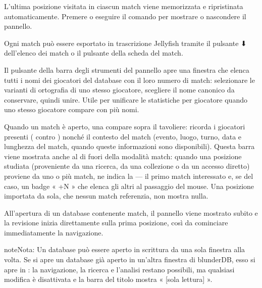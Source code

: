 \documentclass[letterpaper,10pt,italian]{sphinxmanual}
\begin{document}
\sphinxAtStartPar
L’ultima posizione visitata in ciascun match viene memorizzata e ripristinata automaticamente. Premere  o eseguire il comando  per mostrare o nascondere il pannello.

\sphinxAtStartPar
Ogni match può essere esportato in trascrizione Jellyfish  tramite il pulsante ⬇ dell’elenco dei match o il pulsante  della scheda del match.

\sphinxAtStartPar
Il pulsante  della barra degli strumenti del pannello apre una finestra che elenca tutti i nomi dei giocatori del database con il loro numero di match: selezionare le varianti di ortografia di uno stesso giocatore, scegliere il nome canonico da conservare, quindi unire. Utile per unificare le statistiche per giocatore quando uno stesso giocatore compare con più nomi.

\sphinxAtStartPar
Quando un match è aperto, una  compare sopra il tavoliere: ricorda i giocatori presenti ( contro ) nonché il contesto del match (evento, luogo, turno, data e lunghezza del match, quando queste informazioni sono disponibili). Questa barra viene mostrata anche al di fuori della modalità match: quando una posizione studiata (proveniente da una ricerca, da una collezione o da un accesso diretto) proviene da uno o più match, ne indica la  — il primo match interessato e, se del caso, un badge « +N » che elenca gli altri al passaggio del mouse. Una posizione importata da sola, che nessun match referenzia, non mostra nulla.

\sphinxAtStartPar
All’apertura di un database contenente match, il pannello  viene mostrato subito e la revisione inizia direttamente sulla prima posizione, così da cominciare immediatamente la navigazione.

\begin{sphinxadmonition}{note}{Nota:}
\sphinxAtStartPar
Un database può essere aperto in scrittura da una sola finestra alla volta. Se si apre un database già aperto in un’altra finestra di blunderDB, esso si apre in  : la navigazione, la ricerca e l’analisi restano possibili, ma qualsiasi modifica è disattivata e la barra del titolo mostra « {[}sola lettura{]} ».
\end{sphinxadmonition}
\end{document}
